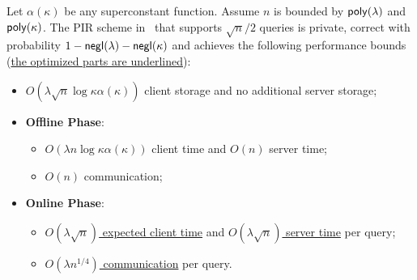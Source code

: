 \begin{theorem}
    \label{thm:main2}
    Let $\alpha(\kappa)$ be any superconstant function. Assume $n$ is bounded by
    $\mathsf{poly}(\lambda)$ and $\mathsf{poly}(\kappa)$. The PIR scheme
    in~ that supports $\sqrt{n}/2$ queries is
    private, correct with probability $1-\mathsf{negl}(\lambda)-\mathsf{negl}(\kappa)$ and
    achieves the following performance bounds (\underline{the optimized parts
    are underlined}):
    \begin{itemize}
        \item $O(\lambda\sqrt{n}\log \kappa \alpha(\kappa))$ client storage and
        no additional server storage;
        \item \textbf{Offline Phase}:
        \begin{itemize}
            \item $O(\lambda n\log \kappa \alpha(\kappa))$ client time and
            $O(n)$ server time;
            \item $O(n)$ communication;
        \end{itemize}
        \item \textbf{Online Phase}:
        \begin{itemize}
            \item \underline{$O(\lambda\sqrt{n})$ expected client time} and
            \underline{$O(\lambda\sqrt{n})$ server time} per query; 
            \item \underline{$O(\lambda n^{1/4})$ communication} per query.
        \end{itemize}
    \end{itemize} 
\end{theorem}

